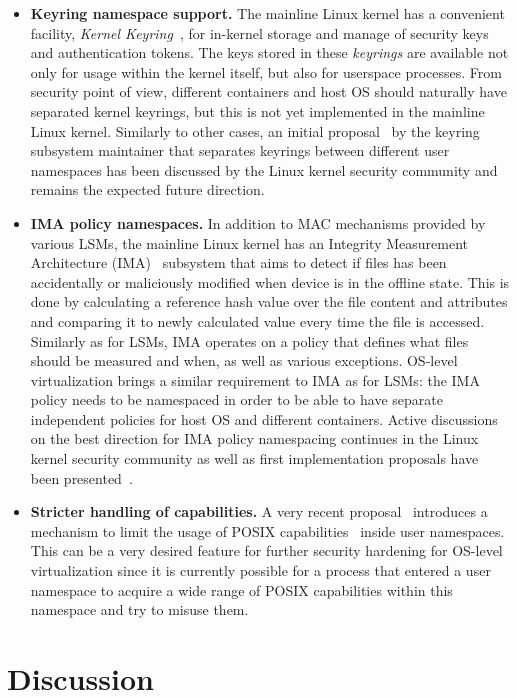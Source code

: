 \begin{itemize}
  \item \textbf{Keyring namespace support.} The mainline Linux kernel has a convenient facility, \textit{Kernel Keyring}~\cite{keyrings}, for in-kernel storage and manage of security keys and authentication tokens. The keys stored in these \textit{keyrings} are available not only for usage within the kernel itself, but also for userspace processes. From security point of view, different containers and host OS should naturally have separated kernel keyrings, but this is not yet implemented in the mainline Linux kernel. Similarly to other cases, an initial proposal~\cite{howells2016} by the keyring subsystem maintainer that separates keyrings between different user namespaces has been discussed by the Linux kernel security community and remains the expected future direction. 
	\item \textbf{IMA policy namespaces.} In addition to MAC mechanisms provided by various LSMs, the mainline Linux kernel has an Integrity Measurement Architecture (IMA)~\cite{ima} subsystem that aims to detect if files has been accidentally or maliciously modified when device is in the offline state. This is done by calculating a reference hash value over the file content and attributes and comparing it to newly calculated value every time the file is accessed. Similarly as for LSMs, IMA operates on a policy that defines what files should be measured and when, as well as various exceptions. OS-level virtualization brings a similar requirement to IMA as for LSMs: the IMA policy needs to be namespaced in order to be able to have separate independent policies for host OS and different containers. Active discussions on the best direction for IMA policy namespacing continues in the Linux kernel security community as well as first implementation proposals have been presented~\cite{magalhaes2017}. 
	\item \textbf{Stricter handling of capabilities.} A very recent proposal~\cite{Bandewar2017} introduces a mechanism to limit the usage of POSIX capabilities~\cite{caps} inside user namespaces. This can be a very desired feature for further security hardening for OS-level virtualization since it is currently possible for a process that entered a user namespace to acquire a wide range of POSIX capabilities within this namespace and try to misuse them. 
\end{itemize}


\section{Discussion}

